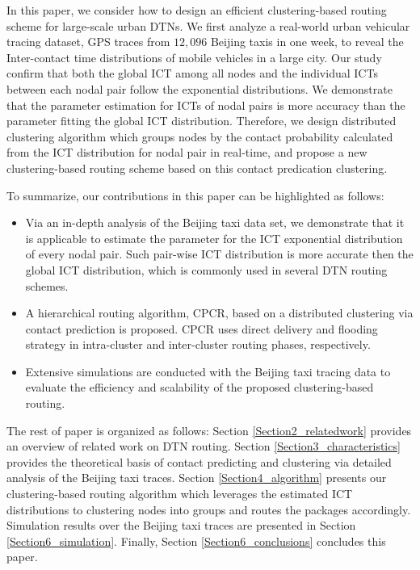 \documentclass[conference]{IEEEtran}
\begin{document}
In this paper, we consider how to design an efficient clustering-based routing scheme for large-scale urban DTNs.  We first
analyze a real-world urban vehicular tracing dataset, GPS traces from $12,096$ Beijing taxis in one week, to reveal the Inter-contact time distributions of mobile vehicles in a large city. Our study confirm that both the global ICT among all nodes and the individual ICTs between each nodal pair follow the exponential distributions.
We demonstrate that the parameter estimation for ICTs of nodal pairs is more accuracy than the parameter fitting the global ICT distribution. Therefore, we design distributed clustering algorithm which groups nodes by the contact probability calculated from the ICT distribution for nodal pair in real-time, and propose a new clustering-based routing scheme based on this contact predication clustering.

To summarize, our contributions in this paper can be highlighted as follows:
    \begin{itemize}
      \item
         Via an in-depth analysis of the Beijing taxi data set, we demonstrate that it is applicable to estimate the parameter for the ICT exponential distribution of every nodal pair. Such pair-wise ICT distribution is more accurate then the global ICT distribution, which is commonly used in several DTN routing schemes.
      \item
         A hierarchical routing algorithm, CPCR, based on a distributed clustering via contact prediction is proposed.  CPCR uses direct delivery and flooding strategy in intra-cluster and inter-cluster routing phases, respectively.
      \item %
        Extensive simulations are conducted with the Beijing taxi tracing data to evaluate the efficiency and scalability of the proposed clustering-based routing.
    \end{itemize}

The rest of paper is organized as follows: Section \ref{Section2_relatedwork} provides an overview of related work on DTN routing.
Section \ref{Section3_characteristics} provides the theoretical basis of contact predicting and clustering via detailed analysis of the Beijing taxi traces. Section \ref{Section4_algorithm} presents our clustering-based routing algorithm which leverages the estimated ICT distributions to clustering nodes into groups and routes the packages accordingly. Simulation results over the Beijing taxi traces are presented in Section \ref{Section6_simulation}. Finally, Section \ref{Section6_conclusions} concludes this paper.
\end{document}

